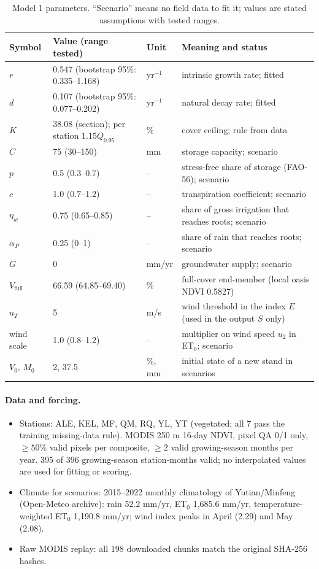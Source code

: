 \documentclass[11pt,a4paper]{article}
\begin{document}
\begin{table}[H]\centering\small
\begin{tabularx}{\textwidth}{@{}l l l Y@{}}
\toprule
Symbol & Value (range tested) & Unit & Meaning and status \\
\midrule
$r$ & 0.547 (bootstrap 95\%: 0.335--1.168) & yr$^{-1}$ & intrinsic growth rate; fitted \\
$d$ & 0.107 (bootstrap 95\%: 0.077--0.202) & yr$^{-1}$ & natural decay rate; fitted \\
$K$ & 38.08 (section); per station $1.15Q_{0.95}$ & \% & cover ceiling; rule from data \\
$C$ & 75 (30--150) & mm & storage capacity; scenario \\
$p$ & 0.5 (0.3--0.7) & -- & stress-free share of storage (FAO-56); scenario \\
$c$ & 1.0 (0.7--1.2) & -- & transpiration coefficient; scenario \\
$\eta_w$ & 0.75 (0.65--0.85) & -- & share of gross irrigation that reaches roots; scenario \\
$\alpha_P$ & 0.25 (0--1) & -- & share of rain that reaches roots; scenario \\
$G$ & 0 & mm/yr & groundwater supply; scenario \\
$V_{\mathrm{full}}$ & 66.59 (64.85--69.40) & \% & full-cover end-member (local oasis NDVI 0.5827) \\
$u_T$ & 5 & m/s & wind threshold in the index $E$ (used in the output $S$ only) \\
wind scale & 1.0 (0.8--1.2) & -- & multiplier on wind speed $u_2$ in ET$_0$; scenario \\
$V_0$, $M_0$ & 2, 37.5 & \%, mm & initial state of a new stand in scenarios \\
\bottomrule
\end{tabularx}
\caption{Model 1 parameters. ``Scenario'' means no field data to fit it; values are stated assumptions with tested ranges.}
\label{tab:par}
\end{table}

\paragraph{Data and forcing.}
\begin{itemize}
\item Stations: ALE, KEL, MF, QM, RQ, YL, YT (vegetated; all 7 pass the training missing-data rule).
MODIS 250 m 16-day NDVI, pixel QA 0/1 only, $\ge50\%$ valid pixels per composite, $\ge2$ valid growing-season months per year.
395 of 396 growing-season station-months valid; no interpolated values are used for fitting or scoring.
\item Climate for scenarios: 2015--2022 monthly climatology of Yutian/Minfeng (Open-Meteo archive):
rain 52.2 mm/yr, ET$_0$ 1,685.6 mm/yr, temperature-weighted ET$_0$ 1,190.8 mm/yr; wind index peaks in April (2.29) and May (2.08).
\item Raw MODIS replay: all 198 downloaded chunks match the original SHA-256 hashes.
\end{itemize}
\end{document}
